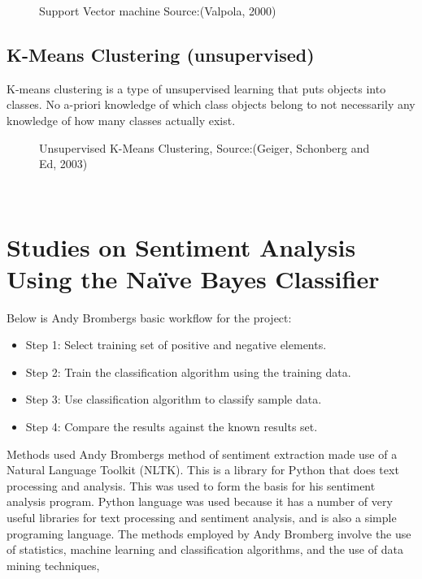 \begin{figure}[h]
  \centering
  \caption[Support vector machine]%
  {Support Vector machine Source:(Valpola, 2000)}
  \label{fig:ALAP:sm3}
\end{figure}

\clearpage
\subsection{K-Means Clustering (unsupervised)}
K-means clustering is a type of unsupervised learning that puts objects into classes. No a-priori
knowledge of which class objects belong to not necessarily any knowledge of how many classes
actually exist.

\begin{figure}[h]
  \centering
  \caption[k-means clustering]%
  {Unsupervised K-Means Clustering, Source:(Geiger, Schonberg and Ed, 2003)}
  \label{fig:ALAP:sm3}
\end{figure}

\leavevmode\\
\section{Studies on Sentiment Analysis Using the Naïve Bayes Classifier}
Below is Andy Bromberg\textquotesingle s basic workflow for the project:
\begin{itemize}
\item Step 1: Select training set of positive and negative elements.
\item Step 2: Train the classification algorithm using the training data.
\item Step 3: Use classification algorithm to classify sample data.
\item Step 4: Compare the results against the known results set.
\end{itemize}
Methods used
Andy Bromberg\textquotesingle s method of sentiment extraction made use of a Natural Language Toolkit
(NLTK). This is a library for Python that does text processing and analysis. This was used to form
the basis for his sentiment analysis program. Python language was used because it has a number
of very useful libraries for text processing and sentiment analysis, and is also a simple programing
language. The methods employed by Andy Bromberg involve the use of statistics, machine
learning and classification algorithms, and the use of data mining techniques, \cite{ref31}

